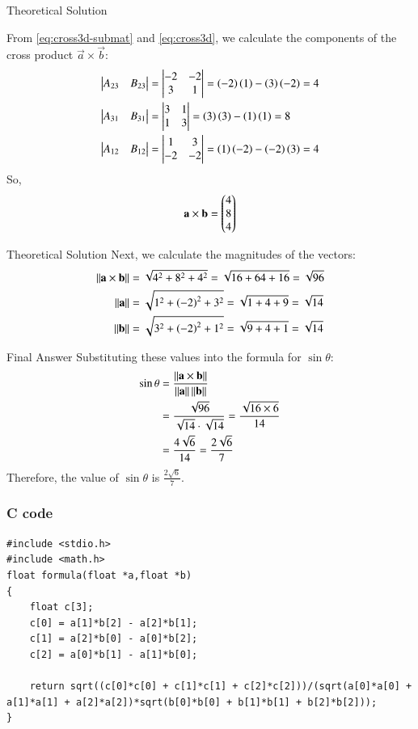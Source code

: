 \documentclass{beamer}
\begin{document}
\begin{frame}{Theoretical Solution}

From \eqref{eq:cross3d-submat} and \eqref{eq:cross3d}, we calculate the components of the cross product $\vec{a} \times \vec{b}$:
\begin{align}
    \begin{vmatrix} A_{23} & B_{23} \end{vmatrix} &= \begin{vmatrix} -2 & -2 \\ 3 & 1 \end{vmatrix} = \left(-2\right)\left(1\right) - \left(3\right)\left(-2\right) = 4 \\
    \begin{vmatrix} A_{31} & B_{31} \end{vmatrix} &= \begin{vmatrix} 3 & 1 \\ 1 & 3 \end{vmatrix} = \left(3\right)\left(3\right) - \left(1\right)\left(1\right) = 8 \\
    \begin{vmatrix} A_{12} & B_{12} \end{vmatrix} &= \begin{vmatrix} 1 & 3 \\ -2 & -2 \end{vmatrix} = \left(1\right)\left(-2\right) - \left(-2\right)\left(3\right) = 4
\end{align}
So,
\begin{align}
    \mathbf{a} \times \mathbf{b} = \begin{pmatrix}4 \\ 8 \\ 4\end{pmatrix}
\end{align}
\end{frame}

\begin{frame}{Theoretical Solution}
Next, we calculate the magnitudes of the vectors:
\begin{align}
    \left\lVert\mathbf{a} \times \mathbf{b}\right\rVert &= \sqrt{4^2 + 8^2 + 4^2} = \sqrt{16 + 64 + 16} = \sqrt{96} \\
    \left\lVert\mathbf{a}\right\rVert &= \sqrt{1^2 + \left(-2\right)^2 + 3^2} = \sqrt{1 + 4 + 9} = \sqrt{14} \\
    \left\lVert\mathbf{b}\right\rVert &= \sqrt{3^2 + \left(-2\right)^2 + 1^2} = \sqrt{9 + 4 + 1} = \sqrt{14}
\end{align}
\end{frame}

\begin{frame}{Final Answer}
Substituting these values into the formula for $\sin\theta$:
\begin{align}
    \sin\theta &= \frac{\left\lVert\mathbf{a} \times \mathbf{b}\right\rVert}{\left\lVert\mathbf{a}\right\rVert  \left\lVert\mathbf{b}\right\rVert} \\
    &= \frac{\sqrt{96}}{\sqrt{14} \cdot \sqrt{14}} = \frac{\sqrt{16 \times 6}}{14} \\
    &= \frac{4\sqrt{6}}{14} = \frac{2\sqrt{6}}{7}
\end{align}
Therefore, the value of $\sin \theta$ is $\frac{2\sqrt{6}}{7}$.
\end{frame}

\begin{frame}[fragile]
    \frametitle{C code}
    \begin{lstlisting}
#include <stdio.h>
#include <math.h>
float formula(float *a,float *b)
{
    float c[3];
    c[0] = a[1]*b[2] - a[2]*b[1];
    c[1] = a[2]*b[0] - a[0]*b[2];
    c[2] = a[0]*b[1] - a[1]*b[0];
    
    return sqrt((c[0]*c[0] + c[1]*c[1] + c[2]*c[2]))/(sqrt(a[0]*a[0] + a[1]*a[1] + a[2]*a[2])*sqrt(b[0]*b[0] + b[1]*b[1] + b[2]*b[2]));
}
    \end{lstlisting}
\end{frame}
\end{document}
